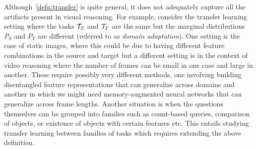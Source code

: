 Although~\cref{defn:transfer} is quite general, it does not adequately capture all the artifacts present in visual reasoning.
For example, consider the transfer learning setting where the tasks $\mathcal{T}_S$ and $\mathcal{T}_T$ are the same 
but the marginal distributions $P_S$ and $P_T$ are different (referred to as \emph{domain adaptation}).
One setting is the case of static images, where this could be due to having different feature combinations in the source and
target but a different setting is in the context of video reasoning where the number of frames can be small in one case and 
large in another.
These require possibly very different methods, one involving building disentangled feature representations that can generalize across 
domains and another in which we might need memory-augmented neural networks that can generalize across frame lengths.
Another situation is when the questions themselves can be grouped into families such as count-based queries, 
comparison of objects, or existence of objects with certain features etc.
This entails studying transfer learning between families of tasks which requires extending the above definition.


